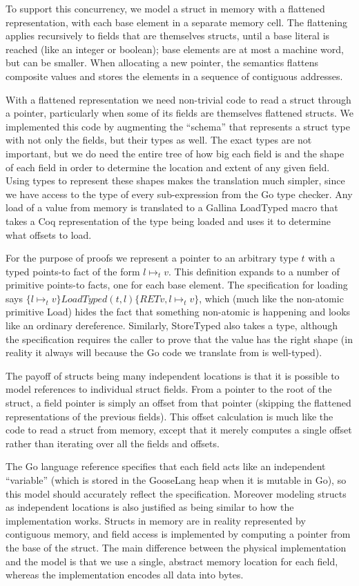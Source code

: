 To support this concurrency, we model a struct in memory with a
flattened representation, with each base element in a separate memory
cell. The flattening applies recursively to fields that are themselves
structs, until a base literal is reached (like an integer or boolean);
base elements are at most a machine word, but can be smaller. When
allocating a new pointer, the semantics flattens composite values and
stores the elements in a sequence of contiguous addresses.

With a flattened representation we need non-trivial code to read a
struct through a pointer, particularly when some of its fields are
themselves flattened structs. We implemented this code by augmenting the
``schema'' that represents a struct type with not only the fields, but
their types as well. The exact types are not important, but we do need
the entire tree of how big each field is and the shape of each field in
order to determine the location and extent of any given field. Using
types to represent these shapes makes the translation much simpler,
since we have access to the type of every sub-expression from the Go
type checker. Any load of a value from memory is translated to a Gallina
LoadTyped macro that takes a Coq representation of the type being loaded
and uses it to determine what offsets to load.

For the purpose of proofs we represent a pointer to an arbitrary type
$t$ with a typed points-to fact of the form $l \mapsto_t v$. This
definition expands to a number of primitive points-to facts, one for
each base element. The specification for loading says
$\{l \mapsto_t v\} LoadTyped(t, l) \{RET v, l \mapsto_t v\}$, which
(much like the non-atomic primitive Load) hides the fact that something
non-atomic is happening and looks like an ordinary dereference.
Similarly, StoreTyped also takes a type, although the specification
requires the caller to prove that the value has the right shape (in
reality it always will because the Go code we translate from is
well-typed).

The payoff of structs being many independent locations is that it is
possible to model references to individual struct fields. From a pointer
to the root of the struct, a field pointer is simply an offset from that
pointer (skipping the flattened representations of the previous fields).
This offset calculation is much like the code to read a struct from
memory, except that it merely computes a single offset rather than
iterating over all the fields and offsets.

The Go language reference specifies that each field acts like an
independent ``variable'' (which is stored in the GooseLang heap when it
is mutable in Go), so this model should accurately reflect the
specification. Moreover modeling structs as independent locations is
also justified as being similar to how the implementation works. Structs
in memory are in reality represented by contiguous memory, and field
access is implemented by computing a pointer from the base of the
struct. The main difference between the physical implementation and the
model is that we use a single, abstract memory location for each field,
whereas the implementation encodes all data into bytes.

